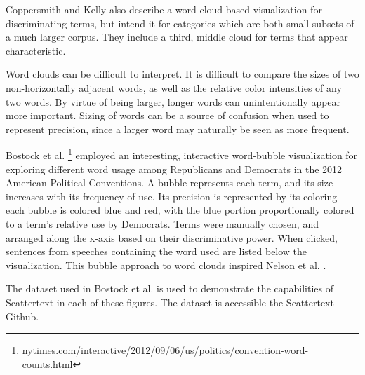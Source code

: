 \documentclass[11pt,a4paper]{article}
\begin{document}
Coppersmith and Kelly  also describe a word-cloud based visualization for discriminating terms, but intend it for categories which are both small subsets of a much larger corpus. They include a third, middle cloud for terms that appear characteristic.  

Word clouds can be difficult to interpret.  It is difficult to compare the sizes of two non-horizontally adjacent words,  as well as the relative color intensities of any two words. By virtue of being larger, longer words can unintentionally appear more important.  Sizing of words can be a source of confusion when used to represent precision, since a larger word may naturally be seen as more frequent.

Bostock et al. \footnote{\href{http://www.nytimes.com/interactive/2012/09/06/us/politics/convention-word-counts.html}{nytimes.com/interactive/2012/09/06/us/politics/convention-word-counts.html}} employed an interesting, interactive word-bubble visualization for exploring different word usage among Republicans and Democrats in the 2012 American Political Conventions.  A bubble represents each term, and its size increases with its frequency of use.  Its precision is represented by its coloring-- each bubble is colored blue and red, with the blue portion proportionally colored to a term's relative use by Democrats.  Terms were manually chosen, and arranged along the x-axis based on their discriminative power. When clicked, sentences from speeches containing the word used are listed below the visualization.  This bubble approach to word clouds inspired Nelson et al. .

The dataset used in Bostock et al.  is used to demonstrate the capabilities of Scattertext in each of these figures.  The dataset is accessible the Scattertext Github.
\end{document}
